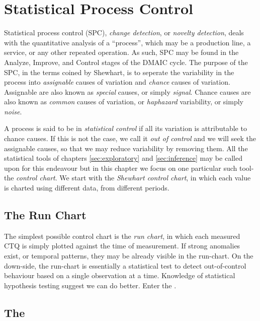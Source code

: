 \chapter[Statistical Process Control]{Statistical Process Control}
\label{sec:spc}

Statistical process control (SPC), \aka \emph{change detection}, or \emph{novelty detection}, deals with the quantitative analysis of a ``process'', which may be a production line, a service, or any other repeated operation.
As such, SPC may be found in the Analyze, Improve, and Control stages of the DMAIC cycle.
The purpose of the SPC, in the terms coined by Shewhart, is to seperate the variability in the process into \emph{assignable} causes of variation and \emph{chance} causes of variation.
Assignable are also known as \emph{special} causes, or simply \emph{signal}.
Chance causes are also known as \emph{common} causes of variation, or \emph{haphazard} variability, or simply \emph{noise}.
 
A process is said to be in \emph{statistical control} if all its variation is attributable to chance causes.
If this is not the case, we call it \emph{out of control} and we will seek the assignable causes, so that we may reduce variability by removing them.
All the statistical tools of chapters \ref{sec:exploratory} and \ref{sec:inference} may be called upon for this endeavour but in this chapter we focus on one particular such tool- the \emph{control chart}.
We start with the \emph{Shewhart control chart}, in which each value is charted using different data, from different periods. 



\section{The Run Chart}
The simplest possible control chart is the \emph{run chart}, in which each measured CTQ is simply plotted against the time of measurement.
If strong anomalies exist, or temporal patterns, they may be already visible in the run-chart.
On the down-side, the run-chart is essentially a statistical test to detect out-of-control behaviour based on a single observation at a time.
Knowledge of statistical hypothesis testing suggest we can do better. 
Enter the \barxChart. 


\section[The \barxChart]{The \barxChart}
\sectionmark{\barxChart}


